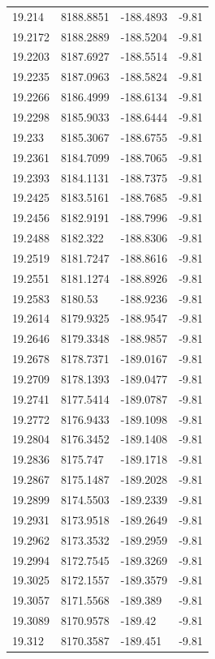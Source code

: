 \begin{table}[H]
\begin{tabular}{llll}
19.214 & 8188.8851 & -188.4893 & -9.81 \\
19.2172 & 8188.2889 & -188.5204 & -9.81 \\
19.2203 & 8187.6927 & -188.5514 & -9.81 \\
19.2235 & 8187.0963 & -188.5824 & -9.81 \\
19.2266 & 8186.4999 & -188.6134 & -9.81 \\
19.2298 & 8185.9033 & -188.6444 & -9.81 \\
19.233 & 8185.3067 & -188.6755 & -9.81 \\
19.2361 & 8184.7099 & -188.7065 & -9.81 \\
19.2393 & 8184.1131 & -188.7375 & -9.81 \\
19.2425 & 8183.5161 & -188.7685 & -9.81 \\
19.2456 & 8182.9191 & -188.7996 & -9.81 \\
19.2488 & 8182.322 & -188.8306 & -9.81 \\
19.2519 & 8181.7247 & -188.8616 & -9.81 \\
19.2551 & 8181.1274 & -188.8926 & -9.81 \\
19.2583 & 8180.53 & -188.9236 & -9.81 \\
19.2614 & 8179.9325 & -188.9547 & -9.81 \\
19.2646 & 8179.3348 & -188.9857 & -9.81 \\
19.2678 & 8178.7371 & -189.0167 & -9.81 \\
19.2709 & 8178.1393 & -189.0477 & -9.81 \\
19.2741 & 8177.5414 & -189.0787 & -9.81 \\
19.2772 & 8176.9433 & -189.1098 & -9.81 \\
19.2804 & 8176.3452 & -189.1408 & -9.81 \\
19.2836 & 8175.747 & -189.1718 & -9.81 \\
19.2867 & 8175.1487 & -189.2028 & -9.81 \\
19.2899 & 8174.5503 & -189.2339 & -9.81 \\
19.2931 & 8173.9518 & -189.2649 & -9.81 \\
19.2962 & 8173.3532 & -189.2959 & -9.81 \\
19.2994 & 8172.7545 & -189.3269 & -9.81 \\
19.3025 & 8172.1557 & -189.3579 & -9.81 \\
19.3057 & 8171.5568 & -189.389 & -9.81 \\
19.3089 & 8170.9578 & -189.42 & -9.81 \\
19.312 & 8170.3587 & -189.451 & -9.81 \\

\end{tabular}
\end{table}
